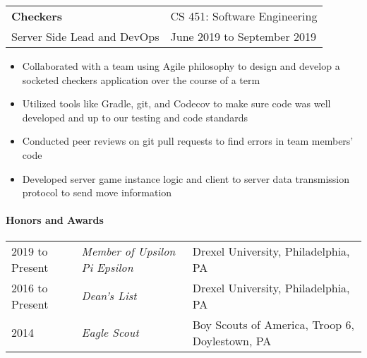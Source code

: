 \documentclass[10pt,]{article}
\let\oldparagraph\paragraph
\renewcommand{\paragraph}[1]{\oldparagraph{#1}\mbox{}}
\begin{document}
\begin{tabularx}{\textwidth}{l X}
	\textbf{Checkers} & \hfill CS 451: Software Engineering\\
	Server Side Lead and DevOps        & \hfill June 2019 to September 2019
\end{tabularx}

\begin{itemize}
	\setlength\itemsep{-0.75em}
	\item Collaborated with a team using Agile philosophy to design and develop a socketed checkers application over the course of a term
	\item Utilized tools like Gradle, git, and Codecov to make sure code was well developed and up to our testing and code standards
	\item Conducted peer reviews on git pull requests to find errors in team members' code
	\item Developed server game instance logic and client to server data transmission protocol to send move information
\end{itemize}


\hypertarget{honors-and-awards}{%
\paragraph{Honors and Awards}\label{honors-and-awards}}

\begin{tabularx}{\textwidth}{l | l X}
	2019 to Present & \textit{Member of Upsilon Pi Epsilon} & \hfill Drexel University, Philadelphia, PA\\
	2016 to Present &  \textit{Dean's List} & \hfill Drexel University, Philadelphia, PA\\
	2014         & \textit{Eagle Scout} & \hfill Boy Scouts of America, Troop 6, Doylestown, PA\\
\end{tabularx}

%
\end{document}
